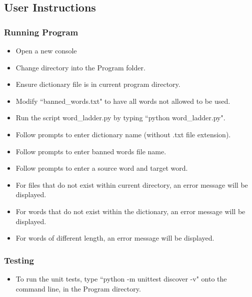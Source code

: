 \documentclass[12pt, a4]{report}
\begin{document}
	\newpage
	\subsection{User Instructions}
		\subsubsection{Running Program}
		\begin{itemize}
			\item Open a new console 
			\item Change directory into the Program folder.
			\item Ensure dictionary file is in current program directory.
			\item Modify ``banned\_words.txt" to have all words not allowed to be used.  
			\item Run the script word\_ladder.py by typing ``python word\_ladder.py".
			\item Follow prompts to enter dictionary name (without .txt file extension).
			\item Follow prompts to enter banned words file name. 
			\item Follow prompts to enter a source word and target word.
			\item For files that do not exist within current directory, an error message will be displayed.
			\item For words that do not exist within the dictionary, an error message will be displayed. 
			\item For words of different length, an error message will be displayed.
		\end{itemize}
		\subsubsection{Testing}
		\begin{itemize}
			\item To run the unit tests, type ``python -m unittest discover -v" onto the command line, in the Program directory. 
		\end{itemize}


	
\end{document}
